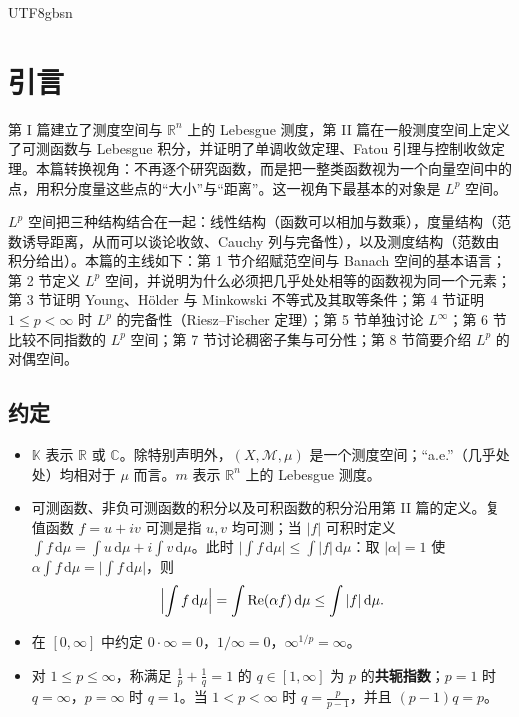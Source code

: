 \documentclass[11pt]{article}
\newcommand{\K}{\mathbb{K}}
\newcommand{\R}{\mathbb{R}}
\newcommand{\C}{\mathbb{C}}
\newcommand{\M}{\mathcal{M}}
\newcommand{\dmu}{\,\mathrm{d}\mu}
\begin{document}
\begin{CJK*}{UTF8}{gbsn}

\maketitle

\section*{引言}

第 I 篇建立了测度空间与 $\R^{n}$ 上的 Lebesgue 测度，第 II 篇在一般测度空间上定义了可测函数与 Lebesgue 积分，并证明了单调收敛定理、Fatou 引理与控制收敛定理。本篇转换视角：不再逐个研究函数，而是把一整类函数视为一个向量空间中的点，用积分度量这些点的“大小”与“距离”。这一视角下最基本的对象是 $L^{p}$ 空间。

$L^{p}$ 空间把三种结构结合在一起：线性结构（函数可以相加与数乘），度量结构（范数诱导距离，从而可以谈论收敛、Cauchy 列与完备性），以及测度结构（范数由积分给出）。本篇的主线如下：第 1 节介绍赋范空间与 Banach 空间的基本语言；第 2 节定义 $L^{p}$ 空间，并说明为什么必须把几乎处处相等的函数视为同一个元素；第 3 节证明 Young、Hölder 与 Minkowski 不等式及其取等条件；第 4 节证明 $1\le p<\infty$ 时 $L^{p}$ 的完备性（Riesz--Fischer 定理）；第 5 节单独讨论 $L^{\infty}$；第 6 节比较不同指数的 $L^{p}$ 空间；第 7 节讨论稠密子集与可分性；第 8 节简要介绍 $L^{p}$ 的对偶空间。

\subsection*{约定}

\begin{itemize}
\item $\K$ 表示 $\R$ 或 $\C$。除特别声明外，$(X,\M,\mu)$ 是一个测度空间；“a.e.”（几乎处处）均相对于 $\mu$ 而言。$m$ 表示 $\R^{n}$ 上的 Lebesgue 测度。
\item 可测函数、非负可测函数的积分以及可积函数的积分沿用第 II 篇的定义。复值函数 $f=u+iv$ 可测是指 $u,v$ 均可测；当 $|f|$ 可积时定义 $\int f\dmu=\int u\dmu+i\int v\dmu$。此时 $\bigl|\int f\dmu\bigr|\le\int|f|\dmu$：取 $|\alpha|=1$ 使 $\alpha\int f\dmu=\bigl|\int f\dmu\bigr|$，则
\[
\Bigl|\int f\dmu\Bigr|=\int \operatorname{Re}(\alpha f)\dmu\le\int|f|\dmu .
\]
\item 在 $[0,\infty]$ 中约定 $0\cdot\infty=0$，$1/\infty=0$，$\infty^{1/p}=\infty$。
\item 对 $1\le p\le\infty$，称满足 $\frac1p+\frac1q=1$ 的 $q\in[1,\infty]$ 为 $p$ 的\textbf{共轭指数}；$p=1$ 时 $q=\infty$，$p=\infty$ 时 $q=1$。当 $1<p<\infty$ 时 $q=\frac{p}{p-1}$，并且 $(p-1)q=p$。
\end{itemize}


\end{CJK*}
\end{document}
